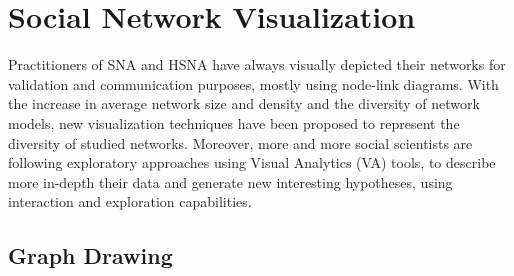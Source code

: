 \section{Social Network Visualization}\label{sec:social-network-visualization}


Practitioners of SNA and HSNA have always visually depicted their networks for validation and communication purposes, mostly using node-link diagrams.
With the increase in average network size and density and the diversity of network models, new visualization techniques have been proposed to represent the diversity of studied networks.
Moreover, more and more social scientists are following exploratory approaches using Visual Analytics (VA) tools, to describe more in-depth their data and generate new interesting hypotheses, using interaction and exploration capabilities.

\subsection{Graph Drawing}

